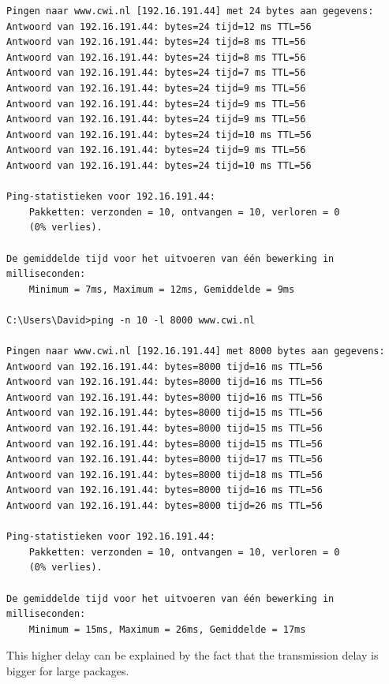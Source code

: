 \documentclass[12pt]{article}
\begin{document}
\begin{enumerate}
\begin{verbatim}
Pingen naar www.cwi.nl [192.16.191.44] met 24 bytes aan gegevens:
Antwoord van 192.16.191.44: bytes=24 tijd=12 ms TTL=56
Antwoord van 192.16.191.44: bytes=24 tijd=8 ms TTL=56
Antwoord van 192.16.191.44: bytes=24 tijd=8 ms TTL=56
Antwoord van 192.16.191.44: bytes=24 tijd=7 ms TTL=56
Antwoord van 192.16.191.44: bytes=24 tijd=9 ms TTL=56
Antwoord van 192.16.191.44: bytes=24 tijd=9 ms TTL=56
Antwoord van 192.16.191.44: bytes=24 tijd=9 ms TTL=56
Antwoord van 192.16.191.44: bytes=24 tijd=10 ms TTL=56
Antwoord van 192.16.191.44: bytes=24 tijd=9 ms TTL=56
Antwoord van 192.16.191.44: bytes=24 tijd=10 ms TTL=56

Ping-statistieken voor 192.16.191.44:
    Pakketten: verzonden = 10, ontvangen = 10, verloren = 0
    (0% verlies).

De gemiddelde tijd voor het uitvoeren van één bewerking in milliseconden:
    Minimum = 7ms, Maximum = 12ms, Gemiddelde = 9ms

C:\Users\David>ping -n 10 -l 8000 www.cwi.nl

Pingen naar www.cwi.nl [192.16.191.44] met 8000 bytes aan gegevens:
Antwoord van 192.16.191.44: bytes=8000 tijd=16 ms TTL=56
Antwoord van 192.16.191.44: bytes=8000 tijd=16 ms TTL=56
Antwoord van 192.16.191.44: bytes=8000 tijd=16 ms TTL=56
Antwoord van 192.16.191.44: bytes=8000 tijd=15 ms TTL=56
Antwoord van 192.16.191.44: bytes=8000 tijd=15 ms TTL=56
Antwoord van 192.16.191.44: bytes=8000 tijd=15 ms TTL=56
Antwoord van 192.16.191.44: bytes=8000 tijd=17 ms TTL=56
Antwoord van 192.16.191.44: bytes=8000 tijd=18 ms TTL=56
Antwoord van 192.16.191.44: bytes=8000 tijd=16 ms TTL=56
Antwoord van 192.16.191.44: bytes=8000 tijd=26 ms TTL=56

Ping-statistieken voor 192.16.191.44:
    Pakketten: verzonden = 10, ontvangen = 10, verloren = 0
    (0% verlies).

De gemiddelde tijd voor het uitvoeren van één bewerking in milliseconden:
    Minimum = 15ms, Maximum = 26ms, Gemiddelde = 17ms
	\end{verbatim}
	This higher delay can be explained by the fact that the transmission delay is bigger for large packages.
\end{enumerate}
\end{document}
